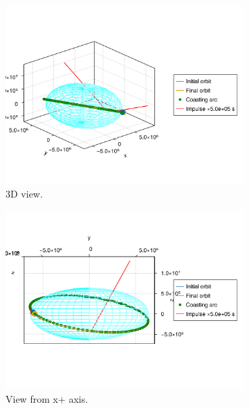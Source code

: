 \begin{figure}[htbp]
    \centering
    \begin{subfigure}{0.49\linewidth}
        \includegraphics[width=\linewidth]{../results/two_body/ipv_noncop/CICIC_3d.png}
        \caption{3D view.}
    \end{subfigure}
    \begin{subfigure}{0.49\linewidth}
        \includegraphics[width=\linewidth]{../results/two_body/ipv_noncop/CICIC_x+.png}
        \caption{View from x+ axis.}
    \end{subfigure}
    \begin{subfigure}{0.49\linewidth}

\end{subfigure}
\end{figure}
